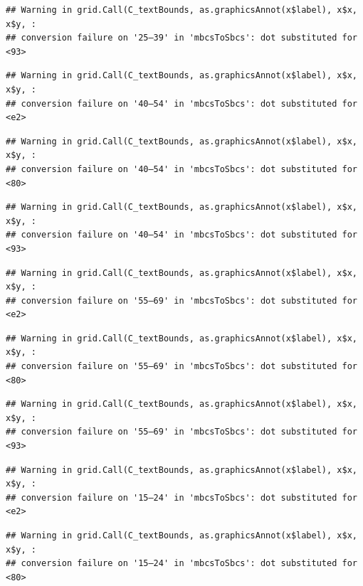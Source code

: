 \documentclass[
]{article}
\begin{document}
\begin{verbatim}
## Warning in grid.Call(C_textBounds, as.graphicsAnnot(x$label), x$x, x$y, :
## conversion failure on '25–39' in 'mbcsToSbcs': dot substituted for <93>
\end{verbatim}

\begin{verbatim}
## Warning in grid.Call(C_textBounds, as.graphicsAnnot(x$label), x$x, x$y, :
## conversion failure on '40–54' in 'mbcsToSbcs': dot substituted for <e2>
\end{verbatim}

\begin{verbatim}
## Warning in grid.Call(C_textBounds, as.graphicsAnnot(x$label), x$x, x$y, :
## conversion failure on '40–54' in 'mbcsToSbcs': dot substituted for <80>
\end{verbatim}

\begin{verbatim}
## Warning in grid.Call(C_textBounds, as.graphicsAnnot(x$label), x$x, x$y, :
## conversion failure on '40–54' in 'mbcsToSbcs': dot substituted for <93>
\end{verbatim}

\begin{verbatim}
## Warning in grid.Call(C_textBounds, as.graphicsAnnot(x$label), x$x, x$y, :
## conversion failure on '55–69' in 'mbcsToSbcs': dot substituted for <e2>
\end{verbatim}

\begin{verbatim}
## Warning in grid.Call(C_textBounds, as.graphicsAnnot(x$label), x$x, x$y, :
## conversion failure on '55–69' in 'mbcsToSbcs': dot substituted for <80>
\end{verbatim}

\begin{verbatim}
## Warning in grid.Call(C_textBounds, as.graphicsAnnot(x$label), x$x, x$y, :
## conversion failure on '55–69' in 'mbcsToSbcs': dot substituted for <93>
\end{verbatim}

\begin{verbatim}
## Warning in grid.Call(C_textBounds, as.graphicsAnnot(x$label), x$x, x$y, :
## conversion failure on '15–24' in 'mbcsToSbcs': dot substituted for <e2>
\end{verbatim}

\begin{verbatim}
## Warning in grid.Call(C_textBounds, as.graphicsAnnot(x$label), x$x, x$y, :
## conversion failure on '15–24' in 'mbcsToSbcs': dot substituted for <80>
\end{verbatim}
\end{document}
